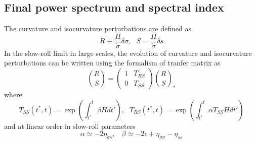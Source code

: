 \documentclass[amssymb,twocolumn,prd,nofootinbib,showpacs]{revtex4-1}
\begin{document}
\subsection{Final power spectrum and spectral index}
The curvature and isocurvature perturbations are defined as
\begin{equation}\label{RS}
R\equiv\frac{H}{\dot\sigma}\delta \sigma, \ \ \ S=\frac{H}{\dot \sigma}\delta s
\end{equation}
In the slow-roll limit in large scales, the evolution of curvature and isocurvature perturbations can be written using the formalism of tranfer matrix as
\begin{equation}
\binom{R }{S}=\begin{pmatrix}1 & T_{RS}\\ 0& T_{SS}\end{pmatrix}\binom{R}{S}_*
\end{equation}
where
\begin{subequations}
\begin{equation}
T_{SS}(t^*,t)=\exp\left(\int^t_{t^*}\beta Hdt'\right), \ \ \
\end{equation}
\begin{equation}\label{TRS}
T_{RS}(t^*,t)=\exp\left(\int^t_{t^*}\alpha T_{SS}Hdt'\right)
\end{equation}
\end{subequations}
and at linear order in slow-roll parameters
\begin{equation}
\alpha\simeq -2\eta_{\sigma s}, \ \ \ \ \beta\simeq-2\epsilon+\eta_{\sigma\sigma}-\eta_{ss}
\end{equation}
\end{document}
